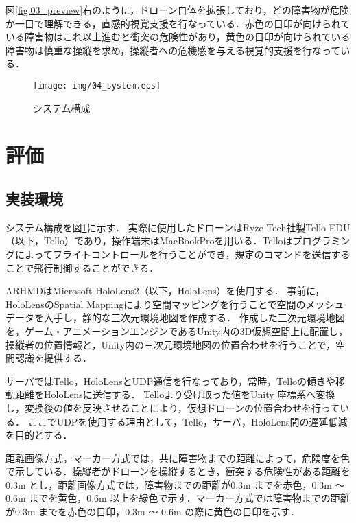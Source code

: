 \documentclass[submit]{ipsj}
\begin{document}
図\ref{fig:03_preview}右のように，ドローン自体を拡張しており，どの障害物が危険か一目で理解できる，直感的視覚支援を行なっている．赤色の目印が向けられている障害物はこれ以上進むと衝突の危険性があり，黄色の目印が向けられている障害物は慎重な操縦を求め，操縦者への危機感を与える視覚的支援を行なっている．


\begin{figure}[tb]
  \centering
  \texttt{[image: img/04\_system.eps]}
  \caption{システム構成}
  \label{fig:04_system}
\end{figure}
  

\section{評価}

\subsection{実装環境}
システム構成を図\ref{fig:04_system}に示す．
実際に使用したドローンはRyze Tech社製Tello EDU（以下，Tello）であり，操作端末はMacBookProを用いる．Telloはプログラミングによってフライトコントロールを行うことができ，規定のコマンドを送信することで飛行制御することができる．
\par
ARHMDはMicrosoft HoloLens2（以下，HoloLens）を使用する．
事前に，HoloLensのSpatial Mappingにより空間マッピングを行うことで空間のメッシュデータを入手し，静的な三次元環境地図を作成する．
作成した三次元環境地図を，ゲーム・アニメーションエンジンであるUnity内の3D仮想空間上に配置し，操縦者の位置情報と，Unity内の三次元環境地図の位置合わせを行うことで，空間認識を提供する．
\par
サーバではTello，HoloLensとUDP通信\cite{web-udp}を行なっており，常時，Telloの傾きや移動距離をHoloLensに送信する．
Telloより受け取った値をUnity 座標系へ変換し，変換後の値を反映させることにより，仮想ドローンの位置合わせを行っている．
ここでUDPを使用する理由として，Tello，サーバ，HoloLens間の遅延低減を目的とする．
\par
距離画像方式，マーカー方式では，共に障害物までの距離によって，危険度を色で示している．操縦者がドローンを操縦するとき，衝突する危険性がある距離を0.3m とし\cite{tech-01}，距離画像方式では，障害物までの距離が0.3m までを赤色，0.3m 〜 0.6m までを黄色，0.6m 以上を緑色で示す．マーカー方式では障害物までの距離が0.3m までを赤色の目印，0.3m 〜 0.6m の際に黄色の目印を示す．
\end{document}
